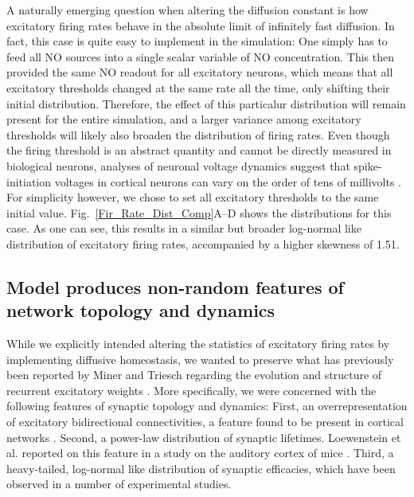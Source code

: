 \documentclass[10pt,letterpaper]{article}
\begin{document}
A naturally emerging question when altering the diffusion constant is how excitatory firing rates behave in the absolute limit of infinitely fast diffusion. In fact, this case is quite easy to implement in the simulation: One simply has to feed all NO sources into a single scalar variable of NO concentration. This then provided the same NO readout for all excitatory neurons, which means that all excitatory thresholds changed at the same rate all the time, only shifting their initial distribution. Therefore, the effect of this particalur distribution will remain present for the entire simulation, and a larger variance among excitatory thresholds will likely also broaden the distribution of firing rates. Even though the firing threshold is an abstract quantity and cannot be directly measured in biological neurons, analyses of neuronal voltage dynamics suggest that spike-initiation voltages in cortical neurons can vary on the order of tens of millivolts \cite{Azouz_2000, Jolivet_2006}. For simplicity however, we chose to set all excitatory thresholds to the same initial value. Fig.~\ref{Fir_Rate_Dist_Comp}A--D shows the distributions for this case. As one can see, this results in a similar but broader log-normal like distribution of excitatory firing rates, accompanied by a higher skewness of 1.51.

\subsection*{Model produces non-random features of network topology and dynamics}\label{Section_Topol_Preservation}
While we explicitly intended altering the statistics of excitatory firing rates by implementing diffusive homeostasis, we wanted to preserve what has previously been reported by Miner and Triesch regarding the evolution and structure of recurrent excitatory weights \cite{SORN_Paper}. More specifically, we were concerned with the following features of synaptic topology and dynamics: First, an overrepresentation of excitatory bidirectional connectivities, a feature found to be present in cortical networks \cite{Song_Connectivity_2005}. Second, a power-law distribution of synaptic lifetimes. Loewenstein et al. reported on this feature in a study on the auditory cortex of mice \cite{Loewenstein_2015}. Third, a heavy-tailed, log-normal like distribution of synaptic efficacies, which have been observed in a number of experimental studies\cite{Song_Connectivity_2005,Yasumatsu_Synapses_2008,Lefort_2009,Loewenstein_Spine_Sizes}.
\end{document}
